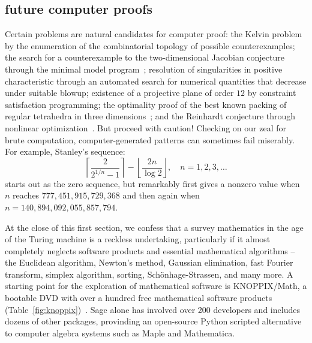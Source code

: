 \documentclass{llncs}
\begin{document}
\subsection{future computer proofs}

Certain problems are natural candidates for computer proof: the Kelvin
problem by the enumeration of the combinatorial topology of possible
counterexamples; the search for a counterexample to the
two-dimensional Jacobian conjecture through the minimal model
program~\cite{Borisov}; resolution of singularities in positive
characteristic through an automated search for numerical quantities
that decrease under suitable blowup; existence of a projective plane
of order $12$ by constraint satisfaction programming; the optimality
proof of the best known packing of regular tetrahedra in three
dimensions~\cite{Chen-2010}; and the Reinhardt conjecture through
nonlinear optimization~\cite{HR11}.  But proceed with caution!
Checking on our zeal for brute
computation, computer-generated patterns can sometimes fail miserably.
For example, Stanley's sequence:
\[
\left\lceil{\frac{2}{2^{1/n} - 1}}\right\rceil- 
\left\lfloor{\frac{2 n}{\log 2}}\right\rfloor,\quad n=1,2,3,\ldots
\]
starts out as the zero sequence, but remarkably first gives a nonzero
value when $n$ reaches $777,451,915,729,368$ and then again when
$n=140,894,092,055,857,794$.





\smallskip At the close of this first section, we confess that a
survey mathematics in the age of the Turing machine is a reckless
undertaking, particularly if it almost completely neglects software
products and essential mathematical algorithms -- the Euclidean
algorithm, Newton's method, Gaussian elimination, fast Fourier
transform, simplex algorithm, sorting, Sch\"onhage-Strassen, and many
more.  A starting point for the exploration of mathematical software
is KNOPPIX/Math, a bootable DVD with over a hundred free mathematical
software products (Table~\ref{fig:knoppix})~\cite{HK08}.  Sage alone
has involved over 200 developers and includes dozens of other
packages, provinding an open-source Python scripted alternative to
computer algebra systems such as Maple and Mathematica.
\end{document}
